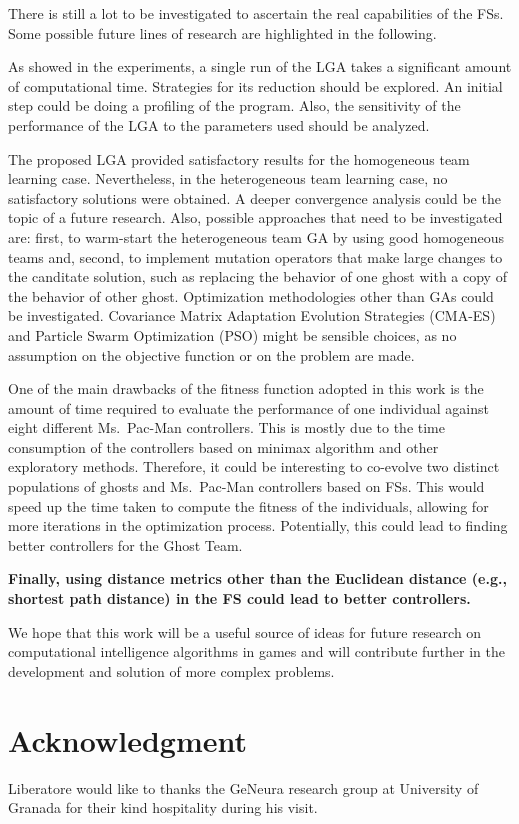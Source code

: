 \documentclass[journal]{IEEEtran}
\begin{document}
There is still a lot to be investigated to ascertain the real capabilities of the FSs. Some possible future lines of research are highlighted in the following.

As showed in the experiments, a single run of the LGA takes a significant amount of computational time. Strategies for its reduction should be explored. An initial step could be doing a profiling of the program. Also, the sensitivity of the performance of the LGA to the parameters used should be analyzed.

The proposed LGA provided satisfactory results for the homogeneous team learning case. Nevertheless, in the heterogeneous team learning case, no satisfactory solutions were obtained. A deeper convergence analysis could be the topic of a future research. Also, possible approaches that need to be investigated are: first, to warm-start the heterogeneous team GA by using good homogeneous teams and, second, to implement mutation operators that make large changes to the canditate solution, such as replacing the behavior of one ghost with a copy of the behavior of other ghost.  Optimization methodologies other than GAs could be investigated. Covariance Matrix Adaptation Evolution Strategies (CMA-ES) and Particle Swarm Optimization (PSO) might be sensible choices, as no assumption on the objective function or on the problem are made.

One of the main drawbacks of the fitness function adopted in this work is the amount of time required to evaluate the performance of one individual against eight different Ms.\  Pac-Man controllers. This is mostly due to the time consumption of the controllers based on minimax algorithm and other exploratory methods. Therefore, it could be interesting to co-evolve two distinct populations of ghosts and Ms.\  Pac-Man controllers based on FSs. This would speed up the time taken to compute the fitness of the individuals, allowing for more iterations in the optimization process. Potentially, this could lead to finding better controllers for the Ghost Team.

\textbf{Finally, using distance metrics other than the Euclidean distance (e.g., shortest path distance) in the FS could lead to better controllers.}

We hope that this work will be a useful source of ideas for future research on computational intelligence algorithms in games and will contribute further in the development and solution of more complex problems.

\section*{Acknowledgment}
Liberatore would like to thanks the GeNeura research group at
University of Granada for their kind hospitality during his visit.
\end{document}
